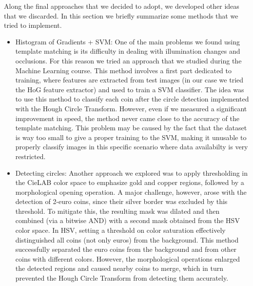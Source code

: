 Along the final approaches that we decided to adopt, we developed other ideas that we discarded. In this section we briefly summarize some methods that we tried to implement.
\begin{itemize}
    \item Histogram of Gradients + SVM: One of the main problems we found using template matching is its difficulty in dealing with illumination changes and occlusions. For this reason we tried an approach that we studied during the Machine Learning course. This method involves a first part dedicated to training, where features are extracted from test images (in our case we tried the HoG feature extractor) and used to train a SVM classifier. The idea was to use this method to classify each coin
            after the circle detection implemented with the Hough Circle Transform. However, even if we measured a significant improvement in speed, the method never came close to the accuracy of the template matching. This problem may be caused by the fact that the dataset is way too small to give a proper training to the SVM, making it unusable to properly classify images in this specific scenario where data availabilty is very restricted.
    \item Detecting circles: Another approach we explored was to apply thresholding in the CieLAB color space to emphasize gold and copper regions, followed by a morphological opening operation. A major challenge, however, arose with the detection of 2-euro coins, since their silver border was excluded by this threshold. To mitigate this, the resulting mask was dilated and then combined (via a bitwise AND) with a second mask obtained from the HSV color space. In HSV, setting a threshold on color saturation effectively distinguished all coins (not only euros) from the background.
    This method successfully separated the euro coins from the background and from other coins with different colors. However, the morphological operations enlarged the detected regions and caused nearby coins to merge, which in turn prevented the Hough Circle Transform from detecting them accurately.
\end{itemize}